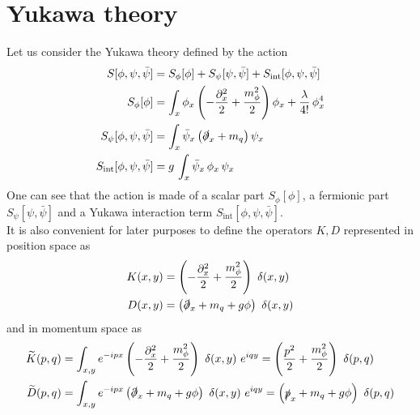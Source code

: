 \section{Yukawa theory}
\label{sec:Yukawa_theory}
Let us consider the Yukawa theory defined by the action
\begin{equation}
\begin{aligned}
    S[\phi,\psi,\bar\psi] &= S_\phi[\phi] + S_\psi[\psi, \bar\psi] + S_\text{int}[\phi, \psi, \bar\psi]\\
     S_\phi[\phi] &= \int_x \phi_x \left(-\frac{\partial^2_x}{2} + \frac{m_\phi^2}{2}\right) \phi_x + \frac{\lambda}{4!} \, \phi_x^4 \\
     S_\psi[\phi, \psi, \bar\psi] &= \int_x \bar \psi_x \left(\slashed{\partial}_x + m_q \right) \psi_x \\
     S_\text{int}[\phi, \psi, \bar\psi] &= g \, \int_x \bar \psi_x \, \phi_x \, \psi_x
    \label{eq:full_action_continuum}
\end{aligned}
\end{equation}
One can see that the action is made of a scalar part $S_\phi[\phi]$, a fermionic part $S_\psi[\psi, \bar\psi]$ and a Yukawa interaction term $S_\text{int}[\phi, \psi, \bar\psi]$. \\
It is also convenient for later purposes to define the operators $K, D$ represented in position space as 
\begin{equation}
    \begin{aligned}
        K(x, y) &=  \left(-\frac{\partial^2_x}{2} + \frac{m_\phi^2}{2}\right) \ \delta(x,y) \\
        D(x, y) &= \left(\slashed{\partial}_x + m_q + g\phi \right) \ \delta(x,y)
    \end{aligned}
    \label{eq:definition_kinetic_terms_continuum}
\end{equation}
and in momentum space as
\begin{equation}
    \begin{aligned}
        \widetilde{K}(p, q) &=  \int_{x,y} e^{-ipx} \left(-\frac{\partial^2_x}{2} + \frac{m_\phi^2}{2}\right) \ \delta(x,y) \ e^{iqy} = \left(\frac{p^2}{2} + \frac{m_\phi^2}{2}\right) \ \delta(p,q) \\
        \widetilde{D}(p, q) &= \int_{x,y} e^{-ipx} \left(\slashed{\partial}_x + m_q + g\phi \right) \ \delta(x,y) \ e^{iqy} = \left(\slashed{p}_x + m_q + g\phi \right) \ \delta(p,q)
    \end{aligned}
    \label{eq:definition_kinetic_terms_continuum}
\end{equation}

